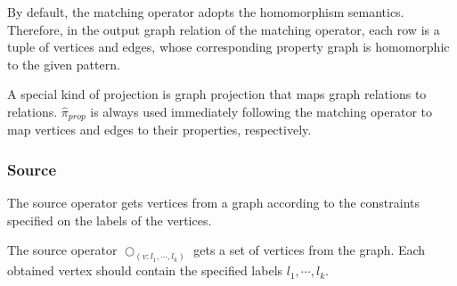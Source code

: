 By default, the matching operator adopts the homomorphism semantics.
Therefore, in the output graph relation of the matching operator, each row is a tuple of vertices and edges, whose corresponding property graph is homomorphic to the given pattern.

A special kind of projection is graph projection that maps graph relations to relations.
$\widehat{\pi}_{prop}$ is always used immediately following the matching operator to map vertices and edges to their properties, respectively.

\iffalse
\subsubsection{Source}
The source operator gets vertices from a graph according to the constraints specified on the labels of the vertices.

\begin{definition}
    The source operator $\bigcirc_{(v:l_1, \cdots, l_k)}$ gets a set of vertices from the graph.
    Each obtained vertex should contain the specified labels $l_1, \cdots, l_k$.
\end{definition}

